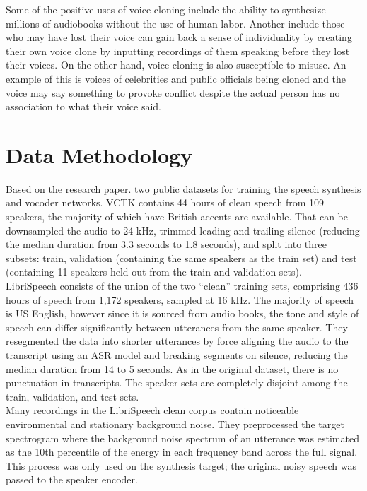 \documentclass[12pt]{report}
\begin{document}
Some of the positive uses of voice cloning include the ability to synthesize millions of audiobooks without the use of human labor. Another include those who may have lost their voice can gain back a sense of individuality by creating their own voice clone by inputting recordings of them speaking before they lost their voices. On the other hand, voice cloning is also susceptible to misuse. An example of this is voices of celebrities and public officials being cloned and the voice may say something to provoke conflict despite the actual person has no association to what their voice said.\\

\section{Data Methodology}
Based on the research paper. two public datasets for training the speech synthesis and vocoder networks. VCTK 
contains 44 hours of clean speech from 109 speakers, the majority of which have British accents are available. That can be
downsampled the audio to 24 kHz, trimmed leading and trailing silence (reducing the median duration
from 3.3 seconds to 1.8 seconds), and split into three subsets: train, validation (containing the same
speakers as the train set) and test (containing 11 speakers held out from the train and validation sets).\\

LibriSpeech consists of the union of the two “clean” training sets, comprising 436 hours of
speech from 1,172 speakers, sampled at 16 kHz. The majority of speech is US English, however since
it is sourced from audio books, the tone and style of speech can differ significantly between utterances
from the same speaker. They resegmented the data into shorter utterances by force aligning the audio to
the transcript using an ASR model and breaking segments on silence, reducing the median duration
from 14 to 5 seconds. As in the original dataset, there is no punctuation in transcripts. The speaker
sets are completely disjoint among the train, validation, and test sets.\\

Many recordings in the LibriSpeech clean corpus contain noticeable environmental and stationary
background noise. They preprocessed the target spectrogram where the background noise spectrum of an utterance was estimated as the 10th percentile of the energy in each frequency band across the full signal. This process was only used on
the synthesis target; the original noisy speech was passed to the speaker encoder.
\end{document}
